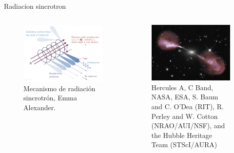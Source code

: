 \documentclass[xetex,aspectratio=169]{beamer}
\begin{document}
	\begin{frame}{Radiacion sincrotron}
		\begin{columns}
			
			\begin{column}{0.48\textwidth}
				\begin{figure}
					\includegraphics[width=\textwidth, keepaspectratio]{./figures/synchrotron/synchrotron.png}
					\caption*{Mecanismo de radiación sincrotrón, Emma Alexander.}
				\end{figure}
			\end{column}
			
			\begin{column}{0.48\textwidth}
				\begin{figure}
					\includegraphics[width=\textwidth, keepaspectratio]{./figures/synchrotron/hercA.jpg}
					\caption*{Hercules A, C Band, NASA, ESA, S. Baum and C. O'Dea (RIT), R. Perley and W. Cotton (NRAO/AUI/NSF), and the Hubble Heritage Team (STScI/AURA)}
				\end{figure}
				
				
			\end{column}
		\end{columns}
	\end{frame}
	
\end{document}
